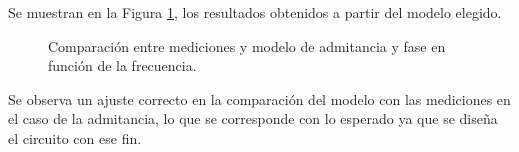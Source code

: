 Se muestran en la Figura \ref{fig:Comp_CAP}, los resultados obtenidos a partir del modelo elegido.

\begin{figure}[H]
    \centering
    \caption{Comparaci\'on entre mediciones y modelo de admitancia y fase en funci\'on de la frecuencia. }
        \label{fig:Comp_CAP}    
\end{figure}
Se observa un ajuste correcto en la comparaci\'on del modelo con las mediciones en el caso de la admitancia, lo que se corresponde con lo esperado ya que se dise\~na el circuito con ese fin. 

